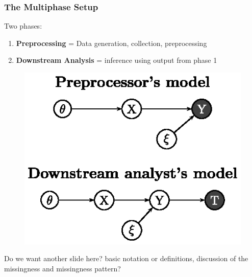 \documentclass[10pt, compress]{beamer}
\begin{document}
\begin{frame}[fragile]
    \frametitle{The Multiphase Setup}

    Two phases:
    \begin{enumerate}
    \item \textbf{Preprocessing} = Data generation, collection, preprocessing
    \item \textbf{Downstream Analysis} = inference using output from phase 1
    \end{enumerate}
    
    \begin{figure}[h!]
    \centering
    \includegraphics[width=.6\textwidth]{assets/two_phase_setting.ps}
    \end{figure}

\end{frame}

\begin{frame}[fragile]
    Do we want another slide here? basic notation or definitions, discussion of the missingness and missingness pattern?

\end{frame}
\end{document}
